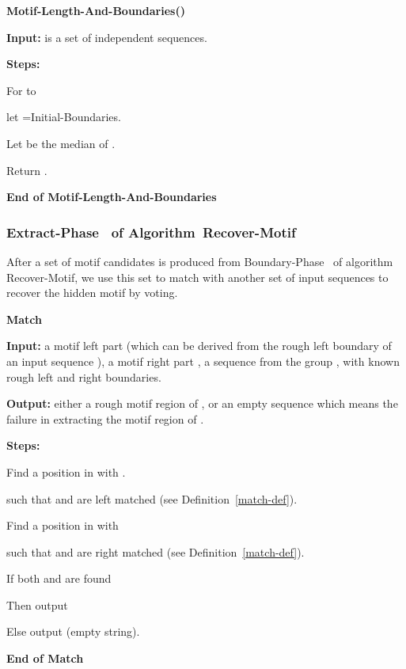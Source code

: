 \documentclass[11pt]{article}
\newcommand{\algmnam}{Recover-Motif}
\newcommand{\algmname}{Algorithm~\algmnam}
\newcommand{\algma}{\algmname~}
\newcommand{\phaseone}{Boundary-Phase}
\newcommand{\phasetwo}{Extract-Phase}
\begin{document}
{\bf Motif-Length-And-Boundaries()}

{\bf Input:}  is a set of
independent  sequences.

{\bf Steps:}

For  to 

\qquad let
=Initial-Boundaries.


Let  be the median of
.


Return .

 {\bf End of Motif-Length-And-Boundaries}







\subsubsection{\phasetwo~ of \algma}




After a set of motif candidates  is produced from \phaseone~ of
algorithm \algmnam, we use this set to match with another set of
input sequences to recover the hidden motif by voting.

\vskip 10pt





{\bf Match}

{\bf Input:} a motif left part   (which can be derived from the
rough left boundary of an input sequence ), a motif right part
, a sequence  from the group , with known rough
left and right boundaries.

{\bf Output:} either a rough motif region of , or an empty
sequence which means the failure in extracting the motif region
 of .


{\bf Steps:}

\qquad Find a position  in  with .


\qquad such that  and  are left matched
(see Definition~\ref{match-def}).


\qquad Find a position  in  with


\qquad such that  and  are right matched
(see Definition~\ref{match-def}).


\qquad If both  and  are found

\qquad Then output 


\qquad Else output  (empty string).


{\bf End of Match}



\vskip 10pt
\end{document}
